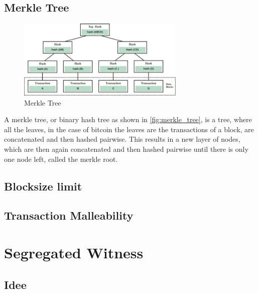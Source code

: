 \subsection{Merkle Tree}
\begin{figure}[h]
    \centering
    \includegraphics[width=8cm]{Ausarbeitung/images/merkle_tree.png}
    \caption{Merkle Tree\protect\footnotemark}
    \label{fig:merkle_tree}
\end{figure}
A merkle tree, or binary hash tree as shown in \autoref{fig:merkle_tree}, is a tree, where all the leaves, in the case of bitcoin the leaves are the transactions of a block, are concatenated and then hashed pairwise. This results in a new layer of nodes, which are then again concatenated and then hashed pairwise until there is only one node left, called the merkle root.


\subsection{Blocksize limit}
\label{sec:Basics:BlocksizeLimit}


\subsection{Transaction Malleability}
\label{ch:TransactionMalleability}




\section{Segregated Witness}
\label{ch:SegWit}


\subsection{Idee}
\label{sec:SegWit:Idee}

